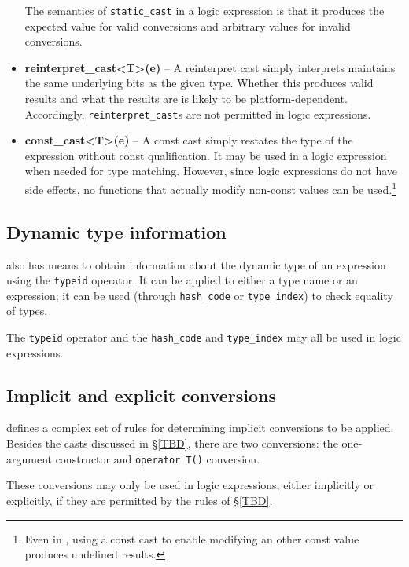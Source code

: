\begin{itemize}
	The semantics of \lstinline|static_cast| in a logic expression is that it produces the expected value for valid conversions and arbitrary values for invalid conversions.
	
	\item \textbf{reinterpret\_cast<T>(e)} -- A reinterpret cast simply interprets maintains the same underlying bits as the given type. 
	Whether this produces valid results and what the results are is likely to be platform-dependent. 
	Accordingly, \lstinline|reinterpret_cast|s are not permitted in logic expressions.
	
	\item \textbf{const\_cast<T>(e)} -- A const cast simply restates the type of the expression without const qualification. 
	It may be used in a logic expression when needed for type matching. 
	However, since logic expressions do not have side effects, no functions that actually modify non-const values can be used.\footnote{Even in \lang{}, using a const cast to enable modifying an other const value produces undefined results.}
	
	

\end{itemize}
\subsection{Dynamic type information}

\lang{} also has means to obtain information about the dynamic
type of an expression using the \lstinline|typeid| operator. It can be applied to either a type name or an expression; it can be used (through \lstinline|hash_code| or \lstinline|type_index|) to check equality of types.

The  \lstinline|typeid| operator and the \lstinline|hash_code| and \lstinline|type_index| may all be used in logic expressions.


\subsection{Implicit and explicit conversions}

\lang{} defines a complex set of rules for determining implicit conversions to be applied. Besides the casts discussed in \S\ref{TBD}, there are two conversions: the one-argument constructor and \lstinline|operator T()| conversion. 

These conversions may only be used in logic expressions, either implicitly or explicitly, if they are permitted by the rules of \S\ref{TBD}. 

